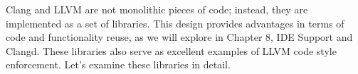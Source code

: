 Clang and LLVM are not monolithic pieces of code; instead, they are implemented as a set of libraries. This design provides advantages in terms of code and functionality reuse, as we will explore in Chapter 8, IDE Support and Clangd. These libraries also serve as excellent examples of LLVM code style enforcement. Let's examine these libraries in detail.



































































































